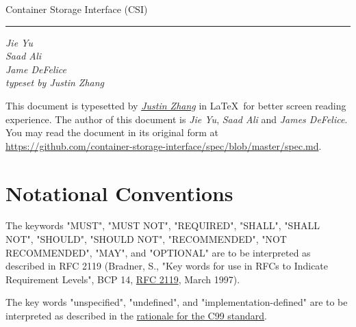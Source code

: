 \documentclass[12pt]{article}
\newcommand{\mytitle}[1]{
  {\Huge #1}\par
}
\newcommand{\mysubtitle}[1]{
  {\emph{#1}}\par
}
\begin{document}
\begin{titlepage}
\begin{minipage}{0.8\linewidth}
  \vspace*{4cm}
  \begin{center}
    \noindent
    \mytitle{Container Storage Interface (CSI)}
    \rule{\linewidth}{0.2ex}\par
    \mysubtitle{Jie Yu \\ Saad Ali \\ Jame DeFelice \\ typeset by Justin Zhang}
  \end{center}
\end{minipage}
\null \vfill
\hfill
\begin{minipage}{0.55\linewidth}
  \begin{flushright}
  \end{flushright}
\end{minipage}
%
\titlepagedecoration
\end{titlepage}

\newpage
\tableofcontents

\newpage
This document is typesetted by
\href{mailto:schnell18@gmail.com}{\emph{Justin Zhang}} in \LaTeX\ for
better screen reading experience. The author of this document is
\emph{Jie Yu}, \emph{Saad Ali} and \emph{James DeFelice}. You may read
the document in its original form at \\
\href{https://github.com/container-storage-interface/spec/blob/master/spec.md}{https://github.com/container-storage-interface/spec/blob/master/spec.md}.

\newpage
\section{Notational Conventions}
The keywords "MUST", "MUST NOT", "REQUIRED", "SHALL", "SHALL NOT",
"SHOULD", "SHOULD NOT", "RECOMMENDED", "NOT RECOMMENDED", "MAY", and
"OPTIONAL" are to be interpreted as described in RFC 2119 (Bradner, S.,
"Key words for use in RFCs to Indicate Requirement Levels", BCP 14,
\href{http://tools.ietf.org/html/rfc2119}{RFC 2119}, March 1997).

The key words "unspecified", "undefined", and "implementation-defined"
are to be interpreted as described in the
\href{http://www.open-std.org/jtc1/sc22/wg14/www/C99RationaleV5.10.pdf\#page=18}{rationale
for the C99 standard}.
\end{document}
